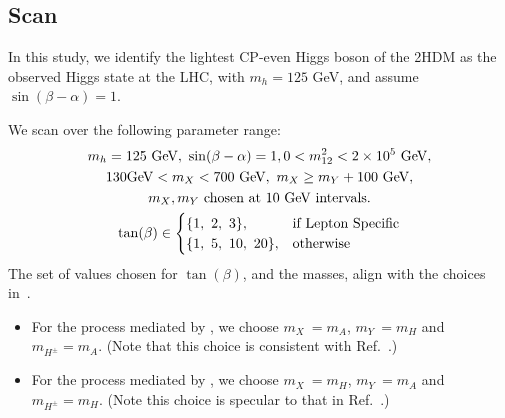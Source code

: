 \subsection{Scan}
In this study, we identify the lightest CP-even Higgs boson of the 2HDM as the observed Higgs state at the LHC, with $m_h=125$ GeV, 
and assume \(\sin (\beta-\alpha) = 1\).

We scan over the following parameter range:
\begin{equation}
\begin{gathered}
     m_{h} = 125~\text{GeV},~\sin(\beta-\alpha)=1, 0 < m_{12}^2 < 2\times 10^5~{\rm GeV},\\
     130 {\rm GeV} < m_X < 700~\text{GeV},~m_X \geq m_Y + 100~\text{GeV},\\
     m_X, m_Y~\text{chosen at}~10~\text{GeV intervals.}\\
     \tan(\beta)\in
         \begin{cases}
             \{1,~2,~3\}, & \text{if Lepton Specific}\\
             \{1,~5,~10,~20\}, & \text{otherwise}\\
         \end{cases}\\
\label{eq1}
\end{gathered}
\end{equation}
The set of values chosen for \(\tan(\beta)\), and the masses, align with the choices in~\cite{Aaboud2018AZHbbll}.
\begin{itemize}
    \item[\textbullet] For the process mediated by \AZH, we choose \(m_X~= m_A\), \(m_Y~= m_H\)  and \(m_{H^\pm} = m_A\). (Note that this choice is consistent with Ref.~\cite{Aaboud2018AZHbbll}.)
    \item[\textbullet] For the process mediated by \HZA, we choose \(m_X~= m_H\), \(m_Y~= m_A\)  and \(m_{H^\pm} = m_H\). (Note this choice is specular to that in Ref.~\cite{Aaboud2018AZHbbll}.) 
\end{itemize}



